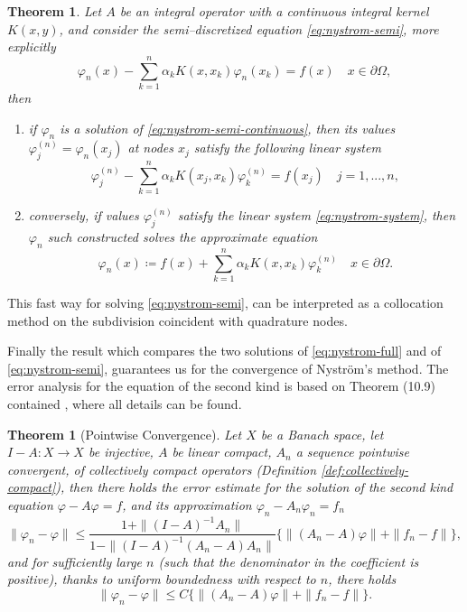 \documentclass[10pt, a4paper, twoside, openright]{book}
\theoremstyle{definition}
\theoremstyle{plain}
\newtheorem{theorem}[subsection]{Theorem}
\theoremstyle{plain}
\theoremstyle{plain}
\theoremstyle{plain}
\theoremstyle{plain}
\theoremstyle{plain}
\theoremstyle{plain}
\theoremstyle{plain}
\let\phi\varphi
\begin{document}
\begin{theorem}
 Let $A$ be an integral operator with a continuous integral kernel $K(x,y)$, 
 and consider the semi--discretized equation \eqref{eq:nystrom-semi}, more explicitly
 \begin{equation}
  \label{eq:nystrom-semi-continuous}
  \phi_n(x) -\sum_{k=1}^n\alpha_k K(x,x_k)\phi_n(x_k)=f(x) \quad x\in \partial \Omega,
 \end{equation}
 then
 \begin{enumerate}
  \item if $\phi_n$ is a solution of \eqref{eq:nystrom-semi-continuous}, then its values $\phi_j^{(n)} = \phi_n(x_j)$ 
  at nodes $x_j$ satisfy the following linear system
  \begin{equation}
    \label{eq:nystrom-system}
    \phi_j^{(n)} - \sum_{k=1}^n\alpha_k K(x_j,x_k)\phi_k^{(n)} = f(x_j)\quad j=1,...,n,
  \end{equation}
  \item conversely, if values $\phi_j^{(n)}$ satisfy the linear system \eqref{eq:nystrom-system}, then $\phi_n$ such constructed solves the approximate equation
  \begin{equation}
   \phi_n(x)\coloneqq f(x) + \sum_{k=1}^n\alpha_k K(x,x_k)\phi_k^{(n)} \quad x\in \partial\Omega.
  \end{equation}
 \end{enumerate}
\end{theorem}
This fast way for solving \eqref{eq:nystrom-semi}, can be interpreted as a collocation method on the subdivision coincident with quadrature nodes.
\par
Finally the result which compares the two solutions of \eqref{eq:nystrom-full} and of 
\eqref{eq:nystrom-semi}, guarantees us for the convergence of Nystr\"om's method.
The error analysis for the equation of the second kind is based on Theorem (10.9) contained \cite{kress:book}, where all details can be found.
\begin{theorem}[Pointwise Convergence]
 Let $X$ be a Banach space, let $I-A:X\to X$ be injective, $A$ be linear compact, $A_n$ a sequence \emph{pointwise convergent}, of \emph{collectively compact} operators (Definition \ref{def:collectively-compact}), 
 then there holds the error estimate for the solution of the second kind equation $\phi-A\phi=f$, and its approximation $\phi_n - A_n\phi_n=f_n$
 \begin{equation}
  \|\phi_n - \phi \| \leq \frac{1 + \|(I-A)^{-1}A_n\|}{1-\|(I-A)^{-1}(A_n-A)A_n\|}\{\|(A_n - A)\phi\| + \| f_n - f\|\},
 \end{equation}
 and for sufficiently large $n$ (such that the denominator in the coefficient is positive), thanks to uniform boundedness with respect to $n$, there holds      
 \begin{equation}
  \|\phi_n - \phi \| \leq C\{\|(A_n - A)\phi\| + \| f_n - f\|\}.
 \end{equation}
\end{theorem}
\end{document}
